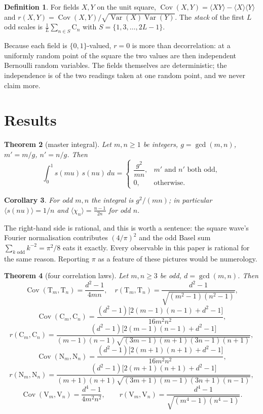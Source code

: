 \documentclass[11pt]{amsart}
\newtheorem{theorem}{Theorem}[section]
\newtheorem{corollary}[theorem]{Corollary}
\theoremstyle{definition}
\newtheorem{definition}[theorem]{Definition}
\theoremstyle{remark}
\begin{document}
\begin{definition}
\label{def:corr}
For fields $X,Y$ on the unit square, $\operatorname{Cov}(X,Y)=\langle XY\rangle-\langle X\rangle\langle Y\rangle$ and $r(X,Y)=\operatorname{Cov}(X,Y)/\sqrt{\operatorname{Var}(X)\operatorname{Var}(Y)}$. The \emph{stack} of the first $L$ odd scales is $\frac1L\sum_{n\in S}\mathrm{C}_n$ with $S=\{1,3,\dots,2L-1\}$.
\end{definition}

Because each field is $\{0,1\}$-valued, $r=0$ is more than decorrelation: at a uniformly random point of the square the two values are then independent Bernoulli random variables. The fields themselves are deterministic; the independence is of the two readings taken at one random point, and we never claim more.

\section{Results}
\label{sec:results}

\begin{theorem}[master integral]
\label{thm:master}
Let $m,n\ge1$ be integers, $g=\gcd(m,n)$, $m'=m/g$, $n'=n/g$. Then
\[
\int_0^1 s(mu)\,s(nu)\,du=
\begin{cases}
\dfrac{g^2}{mn}, & m'\text{ and }n'\text{ both odd},\\[2mm]
0, & \text{otherwise.}
\end{cases}
\]
\end{theorem}

\begin{corollary}
\label{cor:odd}
For odd $m,n$ the integral is $g^2/(mn)$; in particular $\langle s(nu)\rangle=1/n$ and $\langle\chi_n\rangle=\frac{n-1}{2n}$ for odd $n$.
\end{corollary}

The right-hand side is rational, and this is worth a sentence: the square wave's Fourier normalisation contributes $(4/\pi)^2$ and the odd Basel sum $\sum_{k\text{ odd}}k^{-2}=\pi^2/8$ eats it exactly. Every observable in this paper is rational for the same reason. Reporting $\pi$ as a feature of these pictures would be numerology.

\begin{theorem}[four correlation laws]
\label{thm:four}
Let $m,n\ge3$ be odd, $d=\gcd(m,n)$. Then
\[
\operatorname{Cov}(\mathrm{T}_m,\mathrm{T}_n)=\frac{d^2-1}{4mn},\quad
r(\mathrm{T}_m,\mathrm{T}_n)=\frac{d^2-1}{\sqrt{(m^2-1)(n^2-1)}},
\]
\[
\operatorname{Cov}(\mathrm{C}_m,\mathrm{C}_n)=\frac{(d^2-1)\bigl[2(m-1)(n-1)+d^2-1\bigr]}{16m^2n^2},
\]
\[
r(\mathrm{C}_m,\mathrm{C}_n)=\frac{(d^2-1)\bigl[2(m-1)(n-1)+d^2-1\bigr]}{(m-1)(n-1)\sqrt{(3m-1)(m+1)(3n-1)(n+1)}},
\]
\[
\operatorname{Cov}(\mathrm{N}_m,\mathrm{N}_n)=\frac{(d^2-1)\bigl[2(m+1)(n+1)+d^2-1\bigr]}{16m^2n^2},
\]
\[
r(\mathrm{N}_m,\mathrm{N}_n)=\frac{(d^2-1)\bigl[2(m+1)(n+1)+d^2-1\bigr]}{(m+1)(n+1)\sqrt{(3m+1)(m-1)(3n+1)(n-1)}},
\]
\[
\operatorname{Cov}(\mathrm{V}_m,\mathrm{V}_n)=\frac{d^4-1}{4m^2n^2},\qquad
r(\mathrm{V}_m,\mathrm{V}_n)=\frac{d^4-1}{\sqrt{(m^4-1)(n^4-1)}}.
\]
\end{theorem}
\end{document}
